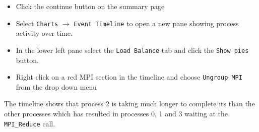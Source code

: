 \documentclass[a4paper,titlepage]{article}
\begin{document}
\begin{itemize}
\item Click the continue button on the summary page
\item Select \texttt{Charts} $\rightarrow$ \texttt{Event Timeline} to open a new pane showing process activity over time.
\item In the lower left pane select the \texttt{Load Balance} tab and click the \texttt{Show pies} button. 
\item Right click on a red MPI section in the timeline and choose \texttt{Ungroup MPI} from the drop down menu
\end{itemize}
The timeline shows that process 2 is taking much longer to complete its than the other processes which has resulted in processes 0, 1 and 3 waiting at the \verb+MPI_Reduce+ call. \\
\end{document}
